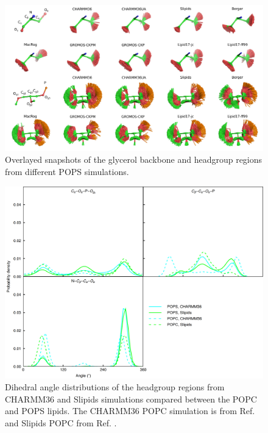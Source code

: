 \documentclass[journal=jpcbfk]{achemso}
\begin{document}
\begin{figure}[]
  \centering
  \includegraphics[width=18.0cm]{../Figs/figS8.png}
  \caption{\label{HGandGLYstructuresPS}
    Overlayed snapshots of the glycerol backbone and headgroup regions from different POPS simulations.
  }
\end{figure}

\begin{figure}[]
  \centering
  \includegraphics[width=16.0cm]{../Figs/figS7PC.png}
  \caption{\label{dihedralsHGpc}
    Dihedral angle distributions of the headgroup regions from CHARMM36 and Slipids simulations
    compared between the POPC and POPS lipids. 
    The CHARMM36 POPC simulation is from Ref.  and Slipids POPC from Ref. .
  }
\end{figure}
\end{document}
